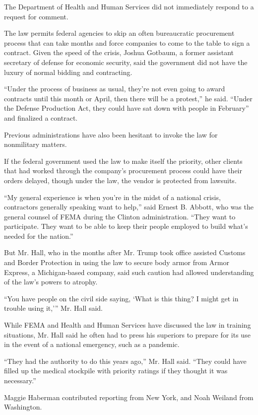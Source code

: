 The Department of Health and Human Services did not immediately respond
to a request for comment.

The law permits federal agencies to skip an often bureaucratic
procurement process that can take months and force companies to come to
the table to sign a contract. Given the speed of the crisis, Joshua
Gotbaum, a former assistant secretary of defense for economic security,
said the government did not have the luxury of normal bidding and
contracting.

``Under the process of business as usual, they're not even going to
award contracts until this month or April, then there will be a
protest,'' he said. ``Under the Defense Production Act, they could have
sat down with people in February'' and finalized a contract.

Previous administrations have also been hesitant to invoke the law for
nonmilitary matters.

If the federal government used the law to make itself the priority,
other clients that had worked through the company's procurement process
could have their orders delayed, though under the law, the vendor is
protected from lawsuits.

``My general experience is when you're in the midst of a national
crisis, contractors generally speaking want to help,'' said Ernest B.
Abbott, who was the general counsel of FEMA during the Clinton
administration. ``They want to participate. They want to be able to keep
their people employed to build what's needed for the nation.''

But Mr. Hall, who in the months after Mr. Trump took office assisted
Customs and Border Protection in using the law to secure body armor from
Armor Express, a Michigan-based company, said such caution had allowed
understanding of the law's powers to atrophy.

``You have people on the civil side saying, `What is this thing? I might
get in trouble using it,''' Mr. Hall said.

While FEMA and Health and Human Services have discussed the law in
training situations, Mr. Hall said he often had to press his superiors
to prepare for its use in the event of a national emergency, such as a
pandemic.

``They had the authority to do this years ago,'' Mr. Hall said. ``They
could have filled up the medical stockpile with priority ratings if they
thought it was necessary.''

Maggie Haberman contributed reporting from New York, and Noah Weiland
from Washington.

